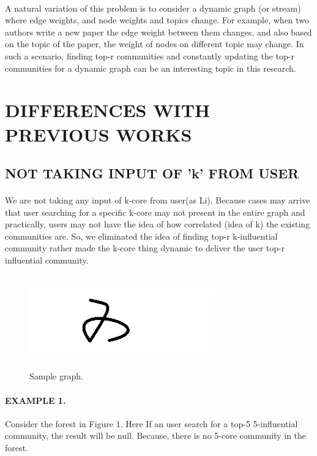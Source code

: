 \documentclass{article}
\begin{document}
	\paragraph{}A natural variation of this problem is to consider a dynamic graph (or stream) where edge weights, and node weights and topics change. For example, when two authors write a new paper the edge weight between them changes, and also based on the topic of the paper, the weight of nodes on different topic may change. In such a scenario, finding top-r communities and constantly updating the top-r communities for a dynamic graph can be an interesting topic in this research.
	
	\newpage
	\section{DIFFERENCES WITH PREVIOUS WORKS}
	\subsection{NOT TAKING INPUT OF 'k' FROM USER}
	\paragraph{}We are not taking any input of k-core from user(as Li). Because cases may arrive that user searching for a specific k-core may not present in the entire graph and practically, users may not have the idea of how correlated (idea of k) the existing communities are. So, we eliminated the idea of finding top-r k-influential community rather made the k-core thing dynamic to deliver the user top-r influential community. 
	\begin{figure}[h!]
		\centering
		\caption{Sample graph.}
		\includegraphics[width=8cm, height=4cm]{Diagram1}
	\end{figure}
	\paragraph{EXAMPLE 1.}Consider the forest in Figure 1. Here If an user search for a top-5 5-influential community, the result will be null. Because, there is no 5-core community in the forest.  
\end{document}
